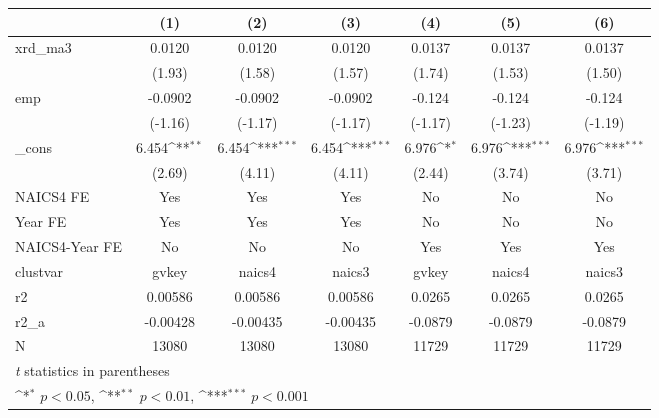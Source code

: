 {
\def\sym#1{\ifmmode^{#1}\else\(^{#1}\)\fi}
\begin{tabular}{l*{6}{c}}
\hline\hline
            &\multicolumn{1}{c}{(1)}         &\multicolumn{1}{c}{(2)}         &\multicolumn{1}{c}{(3)}         &\multicolumn{1}{c}{(4)}         &\multicolumn{1}{c}{(5)}         &\multicolumn{1}{c}{(6)}         \\
\hline
xrd\_ma3     &      0.0120         &      0.0120         &      0.0120         &      0.0137         &      0.0137         &      0.0137         \\
            &      (1.93)         &      (1.58)         &      (1.57)         &      (1.74)         &      (1.53)         &      (1.50)         \\
[1em]
emp         &     -0.0902         &     -0.0902         &     -0.0902         &      -0.124         &      -0.124         &      -0.124         \\
            &     (-1.16)         &     (-1.17)         &     (-1.17)         &     (-1.17)         &     (-1.23)         &     (-1.19)         \\
[1em]
\_cons      &       6.454\sym{**} &       6.454\sym{***}&       6.454\sym{***}&       6.976\sym{*}  &       6.976\sym{***}&       6.976\sym{***}\\
            &      (2.69)         &      (4.11)         &      (4.11)         &      (2.44)         &      (3.74)         &      (3.71)         \\
[1em]
NAICS4 FE   &         Yes         &         Yes         &         Yes         &          No         &          No         &          No         \\
[1em]
Year FE     &         Yes         &         Yes         &         Yes         &          No         &          No         &          No         \\
[1em]
NAICS4-Year FE&          No         &          No         &          No         &         Yes         &         Yes         &         Yes         \\
\hline
clustvar    &       gvkey         &      naics4         &      naics3         &       gvkey         &      naics4         &      naics3         \\
r2          &     0.00586         &     0.00586         &     0.00586         &      0.0265         &      0.0265         &      0.0265         \\
r2\_a        &    -0.00428         &    -0.00435         &    -0.00435         &     -0.0879         &     -0.0879         &     -0.0879         \\
N           &       13080         &       13080         &       13080         &       11729         &       11729         &       11729         \\
\hline\hline
\multicolumn{7}{l}{\footnotesize \textit{t} statistics in parentheses}\\
\multicolumn{7}{l}{\footnotesize \sym{*} \(p<0.05\), \sym{**} \(p<0.01\), \sym{***} \(p<0.001\)}\\
\end{tabular}
}
